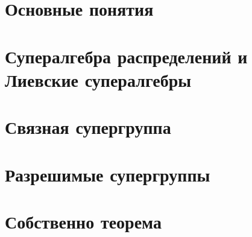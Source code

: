 \section{Основные понятия}
	
%
\newpage
\section{Супералгебра распределений и Лиевские супералгебры}
	
	
%
\newpage
\section{Связная супергруппа}
	

%
\newpage
\section{Разрешимые супергруппы}
	

%
\newpage
\section{Собственно теорема}
	